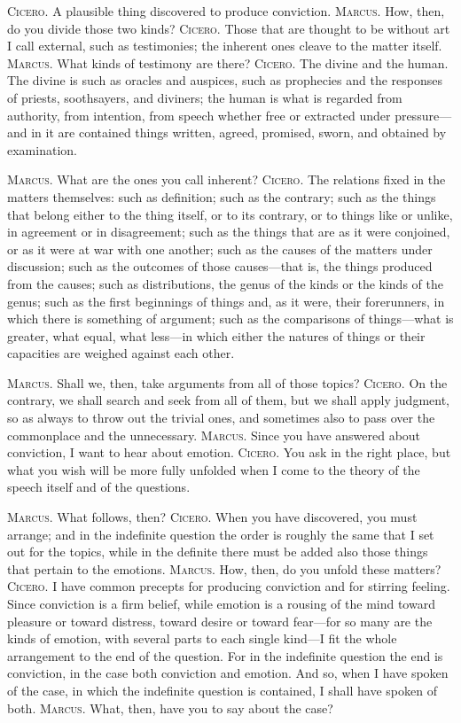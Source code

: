  \textsc{Cicero.} A plausible thing discovered to produce conviction. \textsc{Marcus.} How, then, do you divide those two kinds? \textsc{Cicero.} Those that are thought to be without art I call external, such as testimonies; the inherent ones cleave to the matter itself. \textsc{Marcus.} What kinds of testimony are there? \textsc{Cicero.} The divine and the human. The divine is such as oracles and auspices, such as prophecies and the responses of priests, soothsayers, and diviners; the human is what is regarded from authority, from intention, from speech whether free or extracted under pressure—and in it are contained things written, agreed, promised, sworn, and obtained by examination.

 \textsc{Marcus.} What are the ones you call inherent? \textsc{Cicero.} The relations fixed in the matters themselves: such as definition; such as the contrary; such as the things that belong either to the thing itself, or to its contrary, or to things like or unlike, in agreement or in disagreement; such as the things that are as it were conjoined, or as it were at war with one another; such as the causes of the matters under discussion; such as the outcomes of those causes—that is, the things produced from the causes; such as distributions, the genus of the kinds or the kinds of the genus; such as the first beginnings of things and, as it were, their forerunners, in which there is something of argument; such as the comparisons of things—what is greater, what equal, what less—in which either the natures of things or their capacities are weighed against each other.

 \textsc{Marcus.} Shall we, then, take arguments from all of those topics? \textsc{Cicero.} On the contrary, we shall search and seek from all of them, but we shall apply judgment, so as always to throw out the trivial ones, and sometimes also to pass over the commonplace and the unnecessary. \textsc{Marcus.} Since you have answered about conviction, I want to hear about emotion. \textsc{Cicero.} You ask in the right place, but what you wish will be more fully unfolded when I come to the theory of the speech itself and of the questions.

 \textsc{Marcus.} What follows, then? \textsc{Cicero.} When you have discovered, you must arrange; and in the indefinite question the order is roughly the same that I set out for the topics, while in the definite there must be added also those things that pertain to the emotions. \textsc{Marcus.} How, then, do you unfold these matters? \textsc{Cicero.} I have common precepts for producing conviction and for stirring feeling. Since conviction is a firm belief, while emotion is a rousing of the mind toward pleasure or toward distress, toward desire or toward fear—for so many are the kinds of emotion, with several parts to each single kind—I fit the whole arrangement to the end of the question. For in the indefinite question the end is conviction, in the case both conviction and emotion. And so, when I have spoken of the case, in which the indefinite question is contained, I shall have spoken of both. \textsc{Marcus.} What, then, have you to say about the case?

